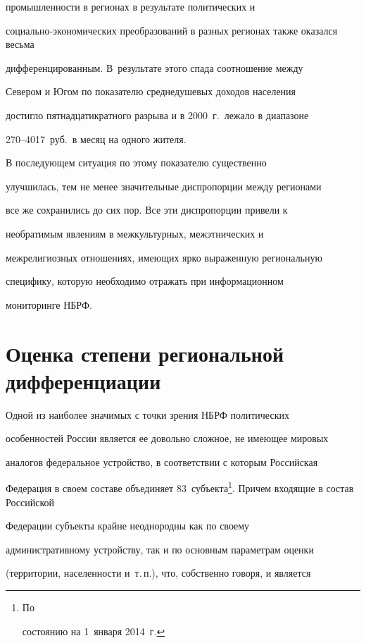 промышленности в регионах в результате политических и


социально-экономических преобразований в разных регионах также оказался весьма


дифференцированным. В~результате этого спада соотношение между


Севером и Югом по показателю среднедушевых доходов населения


достигло пятнадцатикратного разрыва и в 2000~г.\ лежало в диапазоне


270--4017~руб.\ в месяц на одного жителя.





    В последующем ситуация по этому показателю существенно


улучшилась, тем не менее значительные диспропорции между регионами


все же сохранились до сих пор. Все эти диспропорции привели к


необратимым явлениям в межкультурных, межэтнических и


межрелигиозных отношениях, имеющих ярко выраженную региональную


специфику, которую необходимо отражать при информационном


мониторинге НБРФ.





\section{Оценка степени региональной дифференциации}





    Одной из наиболее значимых с точки зрения НБРФ политических


особенностей России является ее довольно сложное, не имеющее мировых


аналогов федеральное устройство, в соответствии с которым Российская


Федерация в своем составе объединяет 83~субъекта\footnote{По


состоянию на 1~января 2014~г.}. Причем входящие в состав Российской


Федерации субъекты крайне неоднородны как по своему


административному устройству, так и по основным параметрам оценки


(территории, населенности и~т.\,п.), что, собственно говоря, и является


